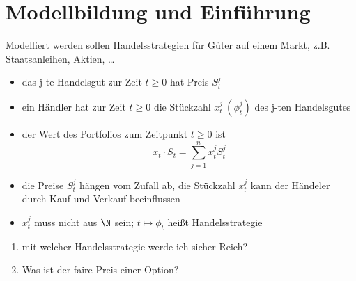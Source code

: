 \section{Modellbildung und Einführung}
	Modelliert werden sollen Handelsstrategien für Güter  auf einem Markt, z.B. Staatsanleihen, Aktien, \ldots
	\begin{itemize}
		\item das j-te Handelsgut  zur Zeit $t\geq 0$ hat Preis $S_t^j$
		\item ein Händler hat zur Zeit $t\geq 0$ die Stückzahl $x_t^j\ (\phi_t^j)$ des j-ten Handelsgutes
		\item der Wert des Portfolios zum Zeitpunkt $t\geq 0$ ist \[ x_t\cdot S_t=\sum_{j=1}^nx_t^jS_t^j\]
		\item die Preise $S_t^j$ hängen vom Zufall ab, die Stückzahl $x_t^j$ kann der Händeler durch Kauf und Verkauf beeinflussen
		\item $x_t^j$ muss nicht aus $\N$ sein; $t\mapsto\phi_t$ heißt Handelsstrategie
	\end{itemize}
	\begin{frag}\leavevmode
		\begin{enumerate}
			\item mit welcher Handelsstrategie werde ich sicher Reich?
			\item Was ist der faire Preis einer Option?
		\end{enumerate}
	\end{frag}